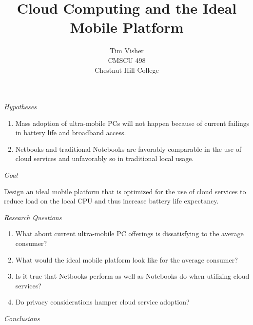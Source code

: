 \documentclass[letterpaper]{article}
\author{Tim Visher\\ CMSCU 498\\ Chestnut Hill College}
\title{Cloud Computing and the Ideal Mobile Platform}
\begin{document}
\Huge{
\begin{center}
  \emph{Hypotheses}
\end{center}

\begin{enumerate}

\item Mass adoption of ultra-mobile PCs will not happen because of current
  failings in battery life and broadband access.

\item Netbooks and traditional Notebooks are favorably comparable in the use of
  cloud services and unfavorably so in traditional local usage.

\end{enumerate}

\newpage

\begin{center}

\emph{Goal}

\end{center}

Design an ideal mobile platform that is optimized for the use of cloud services
to reduce load on the local CPU and thus increase battery life expectancy.

\newpage

\begin{center}

  \emph{Research Questions}

\end{center}

\begin{enumerate}

\item What about current ultra-mobile PC offerings is dissatisfying to the
  average consumer?

\item What would the ideal mobile platform look like for the average consumer?

\item Is it true that Netbooks perform as well as Notebooks do when utilizing cloud services?

\item Do privacy considerations hamper cloud service adoption?

\end{enumerate}

\newpage

\begin{center}

  \emph{Conclusions}


\end{center}}
\end{document}
